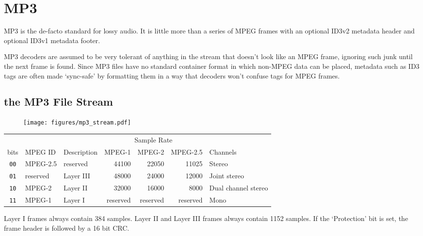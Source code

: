 \chapter{MP3}
MP3 is the de-facto standard for lossy audio.
It is little more than a series of MPEG frames with an
optional ID3v2 metadata header and optional ID3v1 metadata
footer.

MP3 decoders are assumed to be very tolerant of anything in
the stream that doesn't look like an MPEG frame, ignoring such
junk until the next frame is found.
Since MP3 files have no standard container format in which
non-MPEG data can be placed, metadata such as ID3 tags are often
made `sync-safe' by formatting them in a way that decoders won't
confuse tags for MPEG frames.
\section{the MP3 File Stream}
\begin{figure}[h]
\texttt{[image: figures/mp3\_stream.pdf]}
\end{figure}
\begin{table}[h]
\begin{tabular}{|c||l||l||r|r|r||l|}
\hline
& & & \multicolumn{3}{c||}{Sample Rate} & \\
bits & MPEG ID & Description & MPEG-1 & MPEG-2 & MPEG-2.5 & Channels \\
\hline
\texttt{00} & MPEG-2.5 & reserved & 44100 & 22050 & 11025 & Stereo \\
\texttt{01} & reserved & Layer III & 48000 & 24000 & 12000 & Joint stereo \\
\texttt{10} & MPEG-2 & Layer II & 32000 & 16000 & 8000 & Dual channel stereo\\
\texttt{11} & MPEG-1 & Layer I & reserved & reserved & reserved & Mono \\
\hline
\end{tabular}
\end{table}
\par
\noindent
Layer I frames always contain 384 samples.
Layer II and Layer III frames always contain 1152 samples.
If the `Protection' bit is set, the frame header is followed by a
16 bit CRC.

\pagebreak

